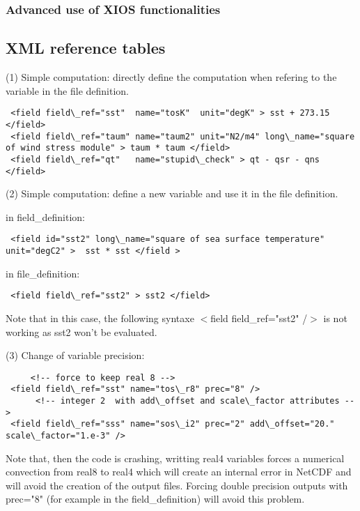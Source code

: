 \documentclass[NEMO_book]{subfiles}
\begin{document}
\subsubsection{Advanced use of XIOS functionalities}

\subsection{XML reference tables}
\label{IOM_xmlref}

(1) Simple computation: directly define the computation when refering to the variable in the file definition.

\vspace{-20pt}
\begin{alltt}  {{\scriptsize    
\begin{verbatim}
 <field field\_ref="sst"  name="tosK"  unit="degK" > sst + 273.15 </field>
 <field field\_ref="taum" name="taum2" unit="N2/m4" long\_name="square of wind stress module" > taum * taum </field>
 <field field\_ref="qt"   name="stupid\_check" > qt - qsr - qns </field>
\end{verbatim}
}}\end{alltt} 

(2) Simple computation: define a new variable and use it in the file definition.

in field\_definition:
\vspace{-20pt}
\begin{alltt}  {{\scriptsize    
\begin{verbatim}
 <field id="sst2" long\_name="square of sea surface temperature" unit="degC2" >  sst * sst </field >
\end{verbatim}
}}\end{alltt} 
in file\_definition:
\vspace{-20pt}
\begin{alltt}  {{\scriptsize    
\begin{verbatim}
 <field field\_ref="sst2" > sst2 </field>
\end{verbatim}
}}\end{alltt} 
Note that in this case, the following syntaxe $<$field field\_ref="sst2" /$>$ is not working as sst2 won't be evaluated.

(3) Change of variable precision:

\vspace{-20pt}
\begin{alltt}  {{\scriptsize    
\begin{verbatim}
     <!-- force to keep real 8 -->
 <field field\_ref="sst" name="tos\_r8" prec="8" />
      <!-- integer 2  with add\_offset and scale\_factor attributes -->
 <field field\_ref="sss" name="sos\_i2" prec="2" add\_offset="20." scale\_factor="1.e-3" />
\end{verbatim}
}}\end{alltt} 
Note that, then the code is crashing, writting real4 variables forces a numerical convection from real8 to real4 which will create an internal error in NetCDF and will avoid the creation of the output files. Forcing double precision outputs with prec="8" (for example in the field\_definition) will avoid this problem.
\end{document}
